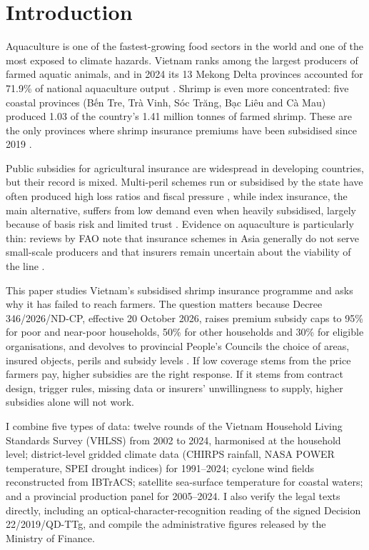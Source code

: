 \documentclass[11pt,a4paper]{article}
\begin{document}
\section{Introduction}
\label{sec:intro}

Aquaculture is one of the fastest-growing food sectors in the world and one of the most exposed to climate hazards. Vietnam ranks among the largest producers of farmed aquatic animals, and in 2024 its 13 Mekong Delta provinces accounted for 71.9\% of national aquaculture output \parencite{nso_pxweb,fao_fishstat2026}. Shrimp is even more concentrated: five coastal provinces (Bến Tre, Trà Vinh, Sóc Trăng, Bạc Liêu and Cà Mau) produced 1.03 of the country's 1.41 million tonnes of farmed shrimp. These are the only provinces where shrimp insurance premiums have been subsidised since 2019 \parencite{decision22_2019,decision13_2022}.

Public subsidies for agricultural insurance are widespread in developing countries, but their record is mixed. Multi-peril schemes run or subsidised by the state have often produced high loss ratios and fiscal pressure \parencite{hazell1992,mahul2010}, while index insurance, the main alternative, suffers from low demand even when heavily subsidised, largely because of basis risk and limited trust \parencite{carter2017,jensen2017,cole2013,clarke2016}. Evidence on aquaculture is particularly thin: reviews by FAO note that insurance schemes in Asia generally do not serve small-scale producers and that insurers remain uncertain about the viability of the line \parencite{vananrooy2006,secretan2007}.

This paper studies Vietnam's subsidised shrimp insurance programme and asks why it has failed to reach farmers. The question matters because Decree 346/2026/ND-CP, effective 20 October 2026, raises premium subsidy caps to 95\% for poor and near-poor households, 50\% for other households and 30\% for eligible organisations, and devolves to provincial People's Councils the choice of areas, insured objects, perils and subsidy levels \parencite{decree346_2026,tckttc2026nd346}. If low coverage stems from the price farmers pay, higher subsidies are the right response. If it stems from contract design, trigger rules, missing data or insurers' unwillingness to supply, higher subsidies alone will not work.

I combine five types of data: twelve rounds of the Vietnam Household Living Standards Survey (VHLSS) from 2002 to 2024, harmonised at the household level; district-level gridded climate data (CHIRPS rainfall, NASA POWER temperature, SPEI drought indices) for 1991--2024; cyclone wind fields reconstructed from IBTrACS; satellite sea-surface temperature for coastal waters; and a provincial production panel for 2005--2024. I also verify the legal texts directly, including an optical-character-recognition reading of the signed Decision 22/2019/QD-TTg, and compile the administrative figures released by the Ministry of Finance.
\end{document}
